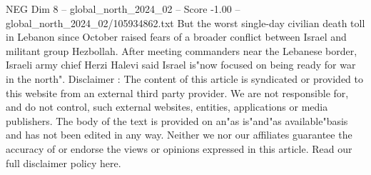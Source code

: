 \begin{textsample}{NEG Dim 8 – global\_north\_2024\_02 – Score -1.00 – global\_north\_2024\_02/105934862.txt}
But the worst single-day civilian death toll in Lebanon since October raised fears of a broader conflict between Israel and militant group Hezbollah.
After meeting commanders near the Lebanese border, Israeli army chief Herzi Halevi said Israel is"now focused on being ready for war in the north".
Disclaimer : The content of this article is syndicated or provided to this website from an external third party provider.
We are not responsible for, and do not control, such external websites, entities, applications or media publishers.
The body of the text is provided on an"as is"and"as available"basis and has not been edited in any way.
Neither we nor our affiliates guarantee the accuracy of or endorse the views or opinions expressed in this article.
Read our full disclaimer policy here.

\end{textsample}
